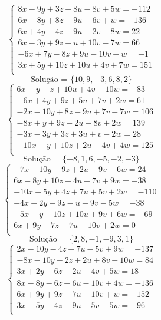 \documentclass[12pt,oneside,a4paper]{article}
\begin{document}
\vspace{\baselineskip}
\begin{equation*}
\begin{cases}
8x-9y+3z-8u-8v+5w=-112 \\
6x-8y+8z-9u-6v+w=-136 \\
6x+4y-4z-9u-2v-8w=22 \\
6x-3y+9z-u+10v-7w=66 \\
-6x+7y-8z+9u-10v-w=-1 \\
3x+5y+10z+10u+4v+7w=151 \\
\end{cases}
\end{equation*}
\begin{equation*}
\text{Solução = }\{10,9,-3,6,8,2\}
\end{equation*}
\vspace{\baselineskip}
\begin{equation*}
\begin{cases}
6x-y-z+10u+4v-10w=-83 \\
-6x+4y+9z+5u+7v+2w=61 \\
-2x-10y+8z-9u+7v-7w=106 \\
-8x+y+9z-2u-8v+2w=139 \\
-3x-3y+3z+3u+v-2w=28 \\
-10x-y+10z+2u-4v+4w=125 \\
\end{cases}
\end{equation*}
\begin{equation*}
\text{Solução = }\{-8,1,6,-5,-2,-3\}
\end{equation*}
\vspace{\baselineskip}
\begin{equation*}
\begin{cases}
-7x+10y-9z+2u-9v-6w=24 \\
6x-8y+10z-4u-7v+9w=-38 \\
-10x-5y+4z+7u+5v+2w=-110 \\
-4x-2y-9z-u-9v-5w=-38 \\
-5x+y+10z+10u+9v+6w=-69 \\
6x+9y-7z+7u-10v+2w=0 \\
\end{cases}
\end{equation*}
\begin{equation*}
\text{Solução = }\{2,8,-1,-9,3,1\}
\end{equation*}
\vspace{\baselineskip}
\begin{equation*}
\begin{cases}
2x-10y-4z-7u-5v+9w=-137 \\
-8x-10y-2z+2u+8v-10w=84 \\
3x+2y-6z+2u-4v+5w=18 \\
8x-8y-6z-6u-10v+4w=-136 \\
6x+9y+9z-7u-10v+w=-152 \\
3x-5y-4z-9u-5v-5w=-96 \\
\end{cases}
\end{equation*}
\end{document}
